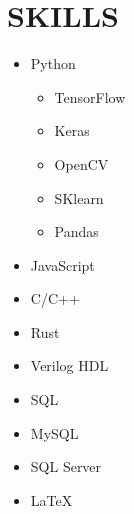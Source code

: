 \documentclass[11pt,a4paper,sans]{moderncv} %
\begin{document}
\section{SKILLS}
    \begin{cvcolumns}
        {
            \vspace{-1.5em}
            \begin{multicols}{2}
                \begin{itemize}
                    \item Python
                        \begin{itemize}
                            \item TensorFlow
                            \item Keras
                            \item OpenCV
                            \item SKlearn
                            \item Pandas
                        \end{itemize}
                    \item JavaScript
                    \item C/C++
                    \item Rust
                    \item Verilog HDL
                    \item SQL
                    \item MySQL
                    \item SQL Server
                    \item \LaTeX
                \end{itemize}
            \end{multicols}
        }


\end{cvcolumns}
\end{document}

